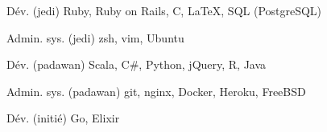 
\begin{cvskills}

  \cvskill
    {Dév. (jedi)} %
    {Ruby, Ruby on Rails, C, LaTeX, SQL (PostgreSQL)} %

  \cvskill
    {Admin. sys. (jedi)} %
    {zsh, vim, Ubuntu} %

  \cvskill
    {Dév. (padawan)} %
    {Scala, C\#, Python, jQuery, R, Java} %

  \cvskill
    {Admin. sys. (padawan)} %
    {git, nginx, Docker, Heroku, FreeBSD} %

  \cvskill
    {Dév. (initié)} %
    {Go, Elixir} %
\end{cvskills}
